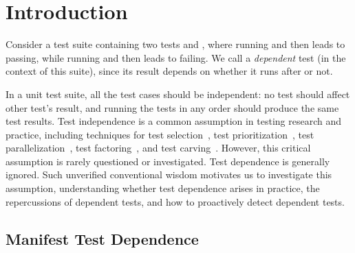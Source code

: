 \section{Introduction}


Consider a test suite containing two tests 
and , where running  and then  leads
to  passing, while running  and then
 leads to  failing. We call 
a \textit{dependent} test (in the context of this suite), since its result depends on
whether it runs after  or not.


In a unit test suite, all the test cases should be independent:
no test should affect other test's result, and
running the tests in any order should produce the same test results.
Test independence is a common assumption in testing research and practice,
including techniques for test selection~\cite{harroldetal:OOPSLA:2001},
test prioritization~\cite{Elbaum:2000:PTC:347324.348910},
test parallelization~\cite{Misailovic:2007}, test factoring~\cite{Saff:2005}, and test carving~\cite{Elbaum:2006}.
However, this critical assumption is rarely questioned or investigated.
Test dependence is generally ignored.
Such unverified conventional wisdom motivates us
to investigate this assumption, understanding
whether test dependence arises in practice, 
the repercussions of dependent tests, and how to proactively
detect dependent tests.


\subsection{Manifest Test Dependence}

